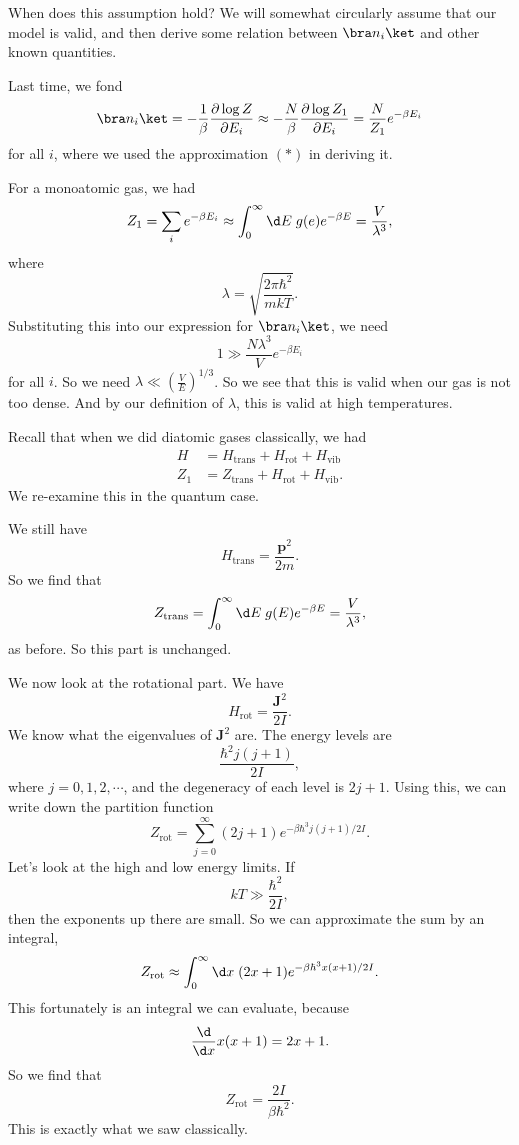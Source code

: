 \documentclass[a4paper]{article}
\begin{document}
When does this assumption hold? We will somewhat circularly assume that our model is valid, and then derive some relation between $\bra n_i \ket$ and other known quantities.

Last time, we fond
\[
  \bra n_i\ket = - \frac{1}{\beta} \frac{\partial \log Z}{\partial E_i} \approx -\frac{N}{\beta} \frac{\partial \log Z_1}{\partial E_i} = \frac{N}{Z_1} e^{-\beta E_i}
\]
for all $i$, where we used the approximation $(*)$ in deriving it.

For a monoatomic gas, we had
\[
  Z_1 = \sum_i e^{-\beta E_i} \approx \int_0^\infty \d E \; g(e) e^{-\beta E} = \frac{V}{\lambda^3},
\]
where
\[
  \lambda = \sqrt{\frac{2\pi \hbar^2}{mkT}}.
\]
Substituting this into our expression for $\bra n_i\ket$, we need
\[
  1 \gg \frac{N \lambda^3}{V} e^{-\beta E_i}
\]
for all $i$. So we need $\lambda \ll \left(\frac{V}{E}\right)^{1/3}$. So we see that this is valid when our gas is not too dense. And by our definition of $\lambda$, this is valid at high temperatures.

Recall that when we did diatomic gases classically, we had
\begin{align*}
  H &= H_{\mathrm{trans}} + H_{\mathrm{rot}} + H_{\mathrm{vib}}\\
  Z_1 &= Z_{\mathrm{trans}} + H_{\mathrm{rot}} + H_{\mathrm{vib}}.
\end{align*}
We re-examine this in the quantum case.

We still have
\[
  H_{\mathrm{trans}} = \frac{\mathbf{p}^2}{2m}.
\]
So we find that
\[
  Z_{\mathrm{trans}} = \int_0^\infty \d E\; g(E) e^{-\beta E} = \frac{V}{\lambda^3},
\]
as before. So this part is unchanged.

We now look at the rotational part. We have
\[
  H_{\mathrm{rot}} = \frac{\mathbf{J}^2}{2I}.
\]
We know what the eigenvalues of $\mathbf{J}^2$ are. The energy levels are
\[
  \frac{\hbar^2 j(j + 1)}{2I},
\]
where $j = 0, 1, 2, \cdots$, and the degeneracy of each level is $2j + 1$. Using this, we can write down the partition function
\[
  Z_{\mathrm{rot}} = \sum_{j = 0}^\infty (2j + 1) e^{-\beta \hbar^3 j(j + 1)/2I}.
\]
Let's look at the high and low energy limits. If
\[
  kT \gg \frac{\hbar^2}{2I},
\]
then the exponents up there are small. So we can approximate the sum by an integral,
\[
  Z_{\mathrm{rot}} \approx \int_0^\infty \d x\; (2x + 1) e^{-\beta \hbar^3 x(x + 1)/2I}.
\]
This fortunately is an integral we can evaluate, because
\[
  \frac{\d}{\d x} x(x + 1) = 2x + 1.
\]
So we find that
\[
  Z_{\mathrm{rot}} = \frac{2I}{\beta \hbar^2}.
\]
This is exactly what we saw classically.
\end{document}
